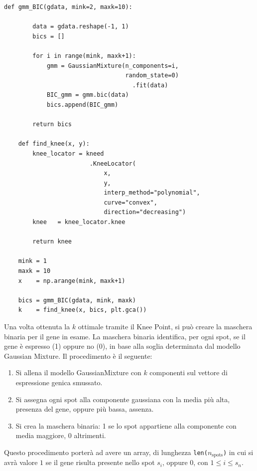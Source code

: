 \begin{lstlisting}[style=mypython,
				   label=code:gmmAndKnee,
				   caption={Funzioni per ottenere BIC e KP},
				   basicstyle=\ttfamily\scriptsize]
	def gmm_BIC(gdata, mink=2, maxk=10):

		data = gdata.reshape(-1, 1)
		bics = []

		for i in range(mink, maxk+1):
			gmm = GaussianMixture(n_components=i, 
								  random_state=0)
								  	.fit(data)
			BIC_gmm = gmm.bic(data)
			bics.append(BIC_gmm)

		return bics
	
	def find_knee(x, y):
		knee_locator = kneed
						.KneeLocator(
							x, 
							y, 
					 		interp_method="polynomial", 
							curve="convex", 
							direction="decreasing")
		knee   = knee_locator.knee  
			
		return knee
	
	mink = 1
	maxk = 10
	x    = np.arange(mink, maxk+1)
	
	bics = gmm_BIC(gdata, mink, maxk)
	k    = find_knee(x, bics, plt.gca())
\end{lstlisting}

Una volta ottenuta la $k$ ottimale tramite il Knee Point, si può creare la
maschera binaria per il gene in esame. 
La maschera binaria identifica, per ogni spot, se il gene è espresso (1) oppure no (0), 
in base alla soglia determinata dal modello Gaussian Mixture.
Il procedimento è il seguente:
\begin{enumerate}
	\item Si allena il modello GaussianMixture con $k$ componenti sul vettore di espressione genica smussato.
	\item Si assegna ogni spot alla componente gaussiana con la media più alta, presenza del gene, oppure più bassa, assenza.
	\item Si crea la maschera binaria: 1 se lo spot appartiene alla componente con media maggiore, 0 altrimenti.
\end{enumerate}

Questo procedimento porterà ad avere un array, di 
lunghezza \texttt{len($n_{\text{spots}}$)} in cui 
si avrà valore $1$ se il gene risulta presente nello spot $s_i$, oppure $0$,  con $1 \le i \le s_n$.

